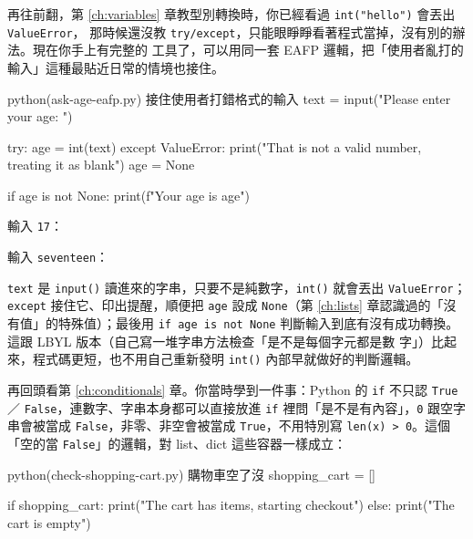 再往前翻，第 \ref{ch:variables} 章教型別轉換時，你已經看過 \texttt{int("hello")} 會丟出 \texttt{ValueError}，
那時候還沒教 \texttt{try/except}，只能眼睜睜看著程式當掉，沒有別的辦法。現在你手上有完整的
工具了，可以用同一套 EAFP 邏輯，把「使用者亂打的輸入」這種最貼近日常的情境也接住。

\begin{example}{python}{(ask-age-eafp.py) 接住使用者打錯格式的輸入}
text = input("Please enter your age: ")

try:
    age = int(text)
except ValueError:
    print("That is not a valid number, treating it as blank")
    age = None

if age is not None:
    print(f"Your age is {age}")
\end{example}

輸入 \texttt{17}：


輸入 \texttt{seventeen}：


\texttt{text} 是 \texttt{input()} 讀進來的字串，只要不是純數字，\texttt{int()} 就會丟出
\texttt{ValueError}；\texttt{except} 接住它、印出提醒，順便把 \texttt{age} 設成
\texttt{None}（第 \ref{ch:lists} 章認識過的「沒有值」的特殊值）；最後用 \texttt{if age is not None}
判斷輸入到底有沒有成功轉換。這跟 LBYL 版本（自己寫一堆字串方法檢查「是不是每個字元都是數
字」）比起來，程式碼更短，也不用自己重新發明 \texttt{int()} 內部早就做好的判斷邏輯。

再回頭看第 \ref{ch:conditionals} 章。你當時學到一件事：Python 的 \texttt{if} 不只認 \texttt{True}／
\texttt{False}，連數字、字串本身都可以直接放進 \texttt{if} 裡問「是不是有內容」，\texttt{0}
跟空字串會被當成 \texttt{False}，非零、非空會被當成 \texttt{True}，不用特別寫
\texttt{len(x) > 0}。這個「空的當 \texttt{False}」的邏輯，對 list、dict 這些容器一樣成立：

\begin{example}{python}{(check-shopping-cart.py) 購物車空了沒}
shopping_cart = []

if shopping_cart:
    print("The cart has items, starting checkout")
else:
    print("The cart is empty")
\end{example}


